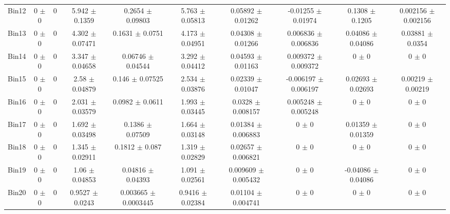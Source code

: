 \begin{tabular}{@{\extracolsep{4pt}}lccccccccc@{}}
     Bin12 & 0 $\pm$ 0 & 0 & 5.942 $\pm$ 0.1359 & 0.2654 $\pm$ 0.09803 & 5.763 $\pm$ 0.05813 & 0.05892 $\pm$ 0.01262 & -0.01255 $\pm$ 0.01974 & 0.1308 $\pm$ 0.1205 & 0.002156 $\pm$ 0.002156 \\ 
     Bin13 & 0 $\pm$ 0 & 0 & 4.302 $\pm$ 0.07471 & 0.1631 $\pm$ 0.0751 & 4.173 $\pm$ 0.04951 & 0.04308 $\pm$ 0.01266 & 0.006836 $\pm$ 0.006836 & 0.04086 $\pm$ 0.04086 & 0.03881 $\pm$ 0.0354 \\ 
     Bin14 & 0 $\pm$ 0 & 0 & 3.347 $\pm$ 0.04658 & 0.06746 $\pm$ 0.04544 & 3.292 $\pm$ 0.04412 & 0.04593 $\pm$ 0.01163 & 0.009372 $\pm$ 0.009372 & 0 $\pm$ 0 & 0 $\pm$ 0 \\ 
     Bin15 & 0 $\pm$ 0 & 0 & 2.58 $\pm$ 0.04879 & 0.146 $\pm$ 0.07525 & 2.534 $\pm$ 0.03876 & 0.02339 $\pm$ 0.01047 & -0.006197 $\pm$ 0.006197 & 0.02693 $\pm$ 0.02693 & 0.00219 $\pm$ 0.00219 \\ 
     Bin16 & 0 $\pm$ 0 & 0 & 2.031 $\pm$ 0.03579 & 0.0982 $\pm$ 0.0611 & 1.993 $\pm$ 0.03445 & 0.0328 $\pm$ 0.008157 & 0.005248 $\pm$ 0.005248 & 0 $\pm$ 0 & 0 $\pm$ 0 \\ 
     Bin17 & 0 $\pm$ 0 & 0 & 1.692 $\pm$ 0.03498 & 0.1386 $\pm$ 0.07509 & 1.664 $\pm$ 0.03148 & 0.01384 $\pm$ 0.006883 & 0 $\pm$ 0 & 0.01359 $\pm$ 0.01359 & 0 $\pm$ 0 \\ 
     Bin18 & 0 $\pm$ 0 & 0 & 1.345 $\pm$ 0.02911 & 0.1812 $\pm$ 0.087 & 1.319 $\pm$ 0.02829 & 0.02657 $\pm$ 0.006821 & 0 $\pm$ 0 & 0 $\pm$ 0 & 0 $\pm$ 0 \\ 
     Bin19 & 0 $\pm$ 0 & 0 & 1.06 $\pm$ 0.04853 & 0.04816 $\pm$ 0.04393 & 1.091 $\pm$ 0.02561 & 0.009609 $\pm$ 0.005432 & 0 $\pm$ 0 & -0.04086 $\pm$ 0.04086 & 0 $\pm$ 0 \\ 
     Bin20 & 0 $\pm$ 0 & 0 & 0.9527 $\pm$ 0.0243 & 0.003665 $\pm$ 0.0003445 & 0.9416 $\pm$ 0.02384 & 0.01104 $\pm$ 0.004741 & 0 $\pm$ 0 & 0 $\pm$ 0 & 0 $\pm$ 0 \\ 
\hline\hline
  \end{tabular}
